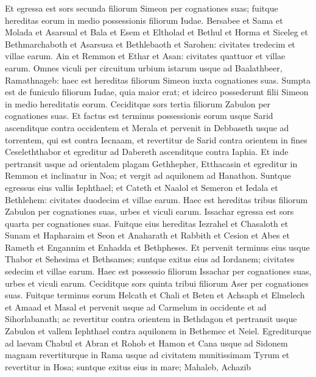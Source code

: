 \begin{biblechapter}
\begin{biblechapter}
\begin{biblechapter}
\begin{biblechapter}
\begin{biblechapter}
\begin{biblechapter}
\begin{biblechapter}
\begin{biblechapter}
\begin{biblechapter}
\begin{biblechapter}
\begin{biblechapter}
\begin{biblechapter}
\begin{biblechapter}
\begin{biblechapter}
\begin{biblechapter}
\begin{biblechapter}
\begin{biblechapter}
\begin{biblechapter}
\begin{biblechapter}
\verse Et egressa est sors secunda filiorum Simeon per cognationes suas; fuitque hereditas 
\verse eorum in medio possessionis filiorum Iudae. Bersabee et Sama et Molada 
\verse et Asarsual et Bala et Esem 
\verse et Eltholad et Bethul et Horma 
\verse et Siceleg et Bethmarchaboth et Asarsusa 
\verse et Bethlebaoth et Sarohen: civitates tredecim et villae earum. 
\verse Ain et Remmon et Ethar et Asan: civitates quattuor et villae earum. 
\verse Omnes viculi per circuitum urbium istarum usque ad Baalathbeer, Ramathnageb: haec est hereditas filiorum Simeon iuxta cognationes suas. 
\verse Sumpta est de funiculo filiorum Iudae, quia maior erat; et idcirco possederunt filii Simeon in medio hereditatis eorum.
 \verse Ceciditque sors tertia filiorum Zabulon per cognationes suas. Et factus est terminus possessionis eorum usque Sarid 
\verse ascenditque contra occidentem et Merala et pervenit in Debbaseth usque ad torrentem, qui est contra Iecnaam, 
 \verse et revertitur de Sarid contra orientem in fines Ceseleththabor et egreditur ad Dabereth ascenditque contra Iaphia. 
\verse Et inde pertransit usque ad orientalem plagam Gethhepher, Etthacasin et egreditur in Remmon et inclinatur in Noa; 
\verse et vergit ad aquilonem ad Hanathon. Suntque egressus eius vallis Iephthael; 
\verse et Cateth et Naalol et Semeron et Iedala et Bethlehem: civitates duodecim et villae earum. 
\verse Haec est hereditas tribus filiorum Zabulon per cognationes suas, urbes et viculi earum.
 \verse Issachar egressa est sors quarta per cognationes suas. 
\verse Fuitque eius hereditas Iezrahel et Chasaloth et Sunam 
\verse et Hapharaim et Seon et Anaharath 
\verse et Rabbith et Cesion et Abes 
\verse et Rameth et Engannim et Enhadda et Bethpheses. 
\verse Et pervenit terminus eius usque Thabor et Sehesima et Bethsames; suntque exitus eius ad Iordanem; civitates sedecim et villae earum. 
\verse Haec est possessio filiorum Issachar per cognationes suas, urbes et viculi earum.
 \verse Ceciditque sors quinta tribui filiorum Aser per cognationes suas. 
\verse Fuitque terminus eorum Helcath et Chali et Beten et Achsaph 
\verse et Elmelech et Amaad et Masal et pervenit usque ad Carmelum in occidente et ad Sihorlabanath; 
\verse ac revertitur contra orientem in Bethdagon et pertransit usque Zabulon et vallem Iephthael contra aquilonem in Bethemec et Neiel. Egrediturque ad laevam Chabul 
\verse et Abran et Rohob et Hamon et Cana usque ad Sidonem magnam 
\verse revertiturque in Rama usque ad civitatem munitissimam Tyrum et revertitur in Hosa; suntque exitus eius in mare; Mahaleb, Achazib 

\end{biblechapter}
\end{biblechapter}
\end{biblechapter}
\end{biblechapter}
\end{biblechapter}
\end{biblechapter}
\end{biblechapter}
\end{biblechapter}
\end{biblechapter}
\end{biblechapter}
\end{biblechapter}
\end{biblechapter}
\end{biblechapter}
\end{biblechapter}
\end{biblechapter}
\end{biblechapter}
\end{biblechapter}
\end{biblechapter}
\end{biblechapter}
